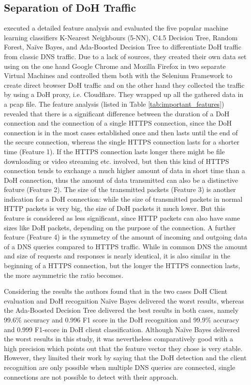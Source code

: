 \subsection{Separation of DoH Traffic} \label{sparating_doh}
\cite{VeshkinEtAl_DoHInsightML} executed a detailed feature analysis and evaluated the five popular machine learning classifiers K-Nearest Neighbours (5-NN), C4.5 Decision Tree, Random Forest, Naïve Bayes, and Ada-Boosted Decision Tree to differentiate DoH traffic from classic DNS traffic. Due to a lack of sources, they created their own data set using on the one hand Google Chrome and Mozilla Firefox in two separate Virtual Machines and controlled them both with the Selenium Framework to create direct browser DoH traffic and on the other hand they collected the traffic by using a DoH proxy, i.e. Cloudflare. They wrapped up all the gathered data in a pcap file. The feature analysis (listed in Table \ref{tab:important_features}) revealed that there is a significant difference between the duration of a DoH connection and the connection of a single HTTPS connection, since the DoH connection is in the most cases established once and then lasts until the end of the secure connection, whereas the single HTTPS connection lasts for a shorter time (Feature 1). If the HTTPS connection lasts longer there might be file downloading or video streaming etc. involved, but then this kind of HTTPS connection tends to exchange a much higher amount of data in short time than a DoH connection, thus the amount of data transmitted can also be a distinctive feature (Feature 2). The size of the transmitted packets (Feature 3) is another indication for a DoH connection: while the size of transmitted packets in normal HTTP packets is very big, the size of DoH packets it much lower. But this feature is considered as less significant, since HTTP packets can also have same sizes like DoH packets, depending on the purpose of the connection. A further feature (Feature 4) is the symmetry of the amount of incoming and outgoing data of a DNS queries compared to HTTPS traffic. While in common DNS the amount and size of requests and responses is nearly identical, it is also similar in the beginning of a HTTPS connection, but the longer the HTTPS connection lasts, the more asymmetric the ratio becomes.

Considering the results the authors found that in the two cases DoH Client evaluation and DoH recognition Naïve Bayes delivered the worst results, whereas the Ada-Boosted Decision Tree delivered the best results in both cases, namely 99.6\% accuracy and 0.996 F1 score in the DoH recognition and 99.9\% accuracy and 0.999 F1-score in DoH client classification. Although Naïve Bayes delivered the worst results in this study, it was nevertheless comparatively good with a high precision which points out that the feature vector they chose is very stable. However, they limited their work by saying that the DoH detection and the client recognition are only possible when multiple DNS queries are connected, single connections are not possible to detect with their approach.

